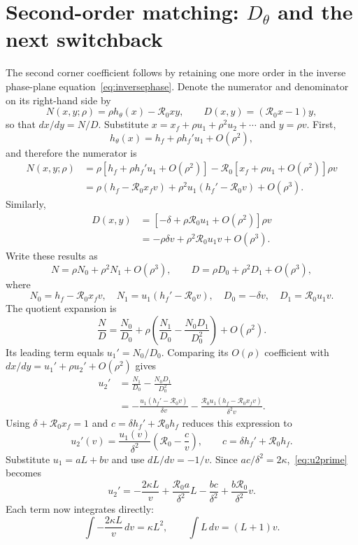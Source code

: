 \documentclass[11pt,a4paper]{article}
\newcommand{\Rzero}{\mathcal R_0}
\newcommand{\xf}{x_f}
\begin{document}
\section{Second-order matching: $D_\theta$ and the next switchback}
\label{sec:D-numerics}
The second corner coefficient follows by retaining one more order in the
inverse phase-plane equation~\eqref{eq:inversephase}. Denote the numerator and
denominator on its right-hand side by
\[
N(x,y;\rho)=\rho h_\theta(x)-\Rzero xy,
\qquad
D(x,y)=(\Rzero x-1)y,
\]
so that $dx/dy=N/D$. Substitute
$x=\xf+\rho u_1+\rho^2u_2+\cdots$ and $y=\rho v$. First,
\[
h_\theta(x)=h_f+\rho h_f'u_1+O(\rho^2),
\]
and therefore the numerator is
\begin{align*}
N(x,y;\rho)
&=\rho\left[h_f+\rho h_f'u_1+O(\rho^2)\right]
-\Rzero\left[\xf+\rho u_1+O(\rho^2)\right]\rho v\\
&=\rho(h_f-\Rzero\xf v)
+\rho^2u_1(h_f'-\Rzero v)+O(\rho^3).
\end{align*}
Similarly,
\begin{align*}
D(x,y)
&=\left[-\delta+\rho\Rzero u_1+O(\rho^2)\right]\rho v\\
&=-\rho\delta v+\rho^2\Rzero u_1v+O(\rho^3).
\end{align*}
Write these results as
\[
N=\rho N_0+\rho^2N_1+O(\rho^3),
\qquad
D=\rho D_0+\rho^2D_1+O(\rho^3),
\]
where
\[
N_0=h_f-\Rzero\xf v,
\quad N_1=u_1(h_f'-\Rzero v),
\quad D_0=-\delta v,
\quad D_1=\Rzero u_1v.
\]
The quotient expansion is
\[
\frac ND
=\frac{N_0}{D_0}
+\rho\left(\frac{N_1}{D_0}-\frac{N_0D_1}{D_0^2}\right)
+O(\rho^2).
\]
Its leading term equals $u_1'=N_0/D_0$. Comparing its $O(\rho)$ coefficient
with $dx/dy=u_1'+\rho u_2'+O(\rho^2)$ gives
\begin{align*}
u_2'
&=\frac{N_1}{D_0}-\frac{N_0D_1}{D_0^2}\\
&=-\frac{u_1(h_f'-\Rzero v)}{\delta v}
-\frac{\Rzero u_1(h_f-\Rzero\xf v)}{\delta^2v}.
\end{align*}
Using $\delta+\Rzero\xf=1$ and
$c=\delta h_f'+\Rzero h_f$ reduces this expression to
\begin{equation}
\label{eq:u2prime}
u_2'(v)
=\frac{u_1(v)}{\delta^2}
\left(\Rzero-\frac{c}{v}\right),
\qquad c=\delta h_f'+\Rzero h_f.
\end{equation}
Substitute $u_1=aL+bv$ and use $dL/dv=-1/v$. Since
$ac/\delta^2=2\kappa$,~\eqref{eq:u2prime} becomes
\[
u_2'
=-\frac{2\kappa L}{v}
+\frac{\Rzero a}{\delta^2}L
-\frac{bc}{\delta^2}
+\frac{b\Rzero}{\delta^2}v.
\]
Each term now integrates directly:
\[
\int-\frac{2\kappa L}{v}\,dv=\kappa L^2,
\qquad
\int L\,dv=(L+1)v.
\]
\end{document}
